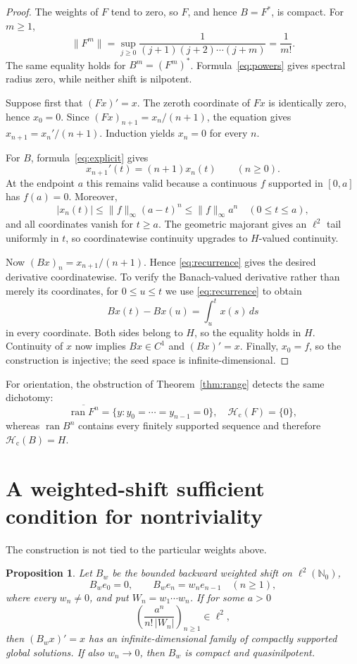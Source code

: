 \documentclass[11pt]{article}
\newtheorem{proposition}{Proposition}
\newcommand{\N}{\mathbb N}
\newcommand{\Hc}{\mathcal H_{\mathrm c}}
\DeclareMathOperator{\ran}{ran}
\begin{document}
\begin{proof}
The weights of $F$ tend to zero, so $F$, and hence $B=F^*$, is compact.
For $m\geq1$,
\[
 \|F^m\|=\sup_{j\geq0}
 \frac1{(j+1)(j+2)\cdots(j+m)}=\frac1{m!}.
\]
The same equality holds for $B^m=(F^m)^*$.  Formula~\eqref{eq:powers}
gives spectral radius zero, while neither shift is nilpotent.

Suppose first that $(Fx)'=x$.  The zeroth coordinate of $Fx$ is identically
zero, hence $x_0=0$.  Since
$(Fx)_{n+1}=x_n/(n+1)$, the equation gives
$x_{n+1}=x_n'/(n+1)$.  Induction yields $x_n=0$ for every $n$.

For $B$, formula~\eqref{eq:explicit} gives
\begin{equation}\label{eq:recurrence}
 x_{n+1}'(t)=(n+1)x_n(t)\qquad(n\geq0).
\end{equation}
At the endpoint $a$ this remains valid because a continuous $f$ supported in
$[0,a]$ has $f(a)=0$.  Moreover,
\[
 |x_n(t)|\leq \|f\|_\infty(a-t)^n
 \leq \|f\|_\infty a^n\quad(0\leq t\leq a),
\]
and all coordinates vanish for $t\geq a$.  The geometric majorant gives an
$\ell^2$ tail uniformly in $t$, so coordinatewise continuity upgrades to
$H$-valued continuity.

Now $(Bx)_n=x_{n+1}/(n+1)$.  Hence \eqref{eq:recurrence} gives the desired
derivative coordinatewise.  To verify the Banach-valued derivative rather
than merely its coordinates, for $0\leq u\leq t$ we use
\eqref{eq:recurrence} to obtain
\[
 Bx(t)-Bx(u)=\int_u^t x(s)\,ds
\]
in every coordinate.  Both sides belong to $H$, so the equality holds in
$H$.  Continuity of $x$ now implies $Bx\in C^1$ and $(Bx)'=x$.  Finally,
$x_0=f$, so the construction is injective; the seed space is
infinite-dimensional.
\end{proof}

For orientation, the obstruction of Theorem~\ref{thm:range} detects the same
dichotomy:
\[
 \overline{\ran F^n}=\{y:y_0=\cdots=y_{n-1}=0\},
 \quad \Hc(F)=\{0\},
\]
whereas $\ran B^n$ contains every finitely supported sequence and therefore
$\Hc(B)=H$.

\section{A weighted-shift sufficient condition for nontriviality}

The construction is not tied to the particular weights above.

\begin{proposition}\label{prop:generalweights}
Let $B_w$ be the bounded backward weighted shift on $\ell^2(\N_0)$,
\[
 B_w e_0=0,\qquad B_w e_n=w_ne_{n-1}\quad(n\geq1),
\]
where every $w_n\ne0$, and put $W_n=w_1\cdots w_n$.  If for some $a>0$
\begin{equation}\label{eq:weightcriterion}
 \left(\frac{a^n}{n!\,|W_n|}\right)_{n\geq1}\in\ell^2,
\end{equation}
then $(B_wx)'=x$ has an infinite-dimensional family of compactly supported
global solutions.  If also $w_n\to0$, then $B_w$ is compact and
quasinilpotent.
\end{proposition}
\end{document}
